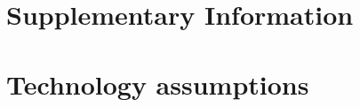 \documentclass[11pt, 5p, nopreprintline]{elsarticle}
\begin{document}
\printglossary[type=\acronymtype]

\renewcommand{\ttdefault}{\sfdefault}



\newpage

\makeatletter
\renewcommand \thesection{S\@arabic\c@section}
\renewcommand\thetable{S\@arabic\c@table}
\renewcommand \thefigure{S\@arabic\c@figure}
\makeatother
\renewcommand{\citenumfont}[1]{S#1}
\setcounter{equation}{0}
\setcounter{figure}{0}
\setcounter{table}{0}
\setcounter{section}{0}


\section*{Supplementary Information}
\label{sec:si}

\section{Technology assumptions}
\label{sec:si_1}



\end{document}
